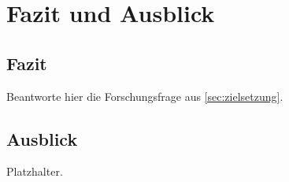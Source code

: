 
\chapter{Fazit und Ausblick}\label{ch:fazit}

\section{Fazit}\label{sec:fazit}

Beantworte hier die Forschungsfrage aus \autoref{sec:zielsetzung}.

\section{Ausblick}\label{sec:ausblick}

Platzhalter.
